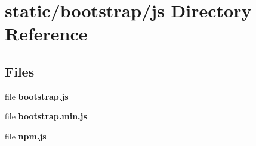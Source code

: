\section{static/bootstrap/js Directory Reference}
\label{dir_5edbd84909acc9fd79050d9cfb9d7127}
\subsection*{Files}
\begin{DoxyCompactItemize}
\item 
file {\bf bootstrap.\+js}
\item 
file {\bf bootstrap.\+min.\+js}
\item 
file {\bf npm.\+js}
\end{DoxyCompactItemize}
